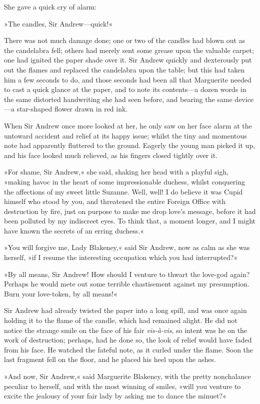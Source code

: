 She gave a quick cry of alarm:

»The candles, Sir Andrew\allowbreak---\allowbreak quick!«

There was not much damage done; one or two of the candles had blown out as the candelabra fell; others had merely sent some grease upon the valuable carpet; one had ignited the paper shade over it. Sir Andrew quickly and dexterously put out the flames and replaced the candelabra upon the table; but this had taken him a few seconds to do, and those seconds had been all that Marguerite needed to cast a quick glance at the paper, and to note its contents\allowbreak---\allowbreak a dozen words in the same distorted handwriting she had seen before, and bearing the same device\allowbreak---\allowbreak a star-shaped flower drawn in red ink.

When Sir Andrew once more looked at her, he only saw on her face alarm at the untoward accident and relief at its happy issue; whilst the tiny and momentous note had apparently fluttered to the ground. Eagerly the young man picked it up, and his face looked much relieved, as his fingers closed tightly over it.

»For shame, Sir Andrew,« she said, shaking her head with a playful sigh, »making havoc in the heart of some impressionable duchess, whilst conquering the affections of my sweet little Suzanne. Well, well! I do believe it was Cupid himself who stood by you, and threatened the entire Foreign Office with destruction by fire, just on purpose to make me drop love's message, before it had been polluted by my indiscreet eyes. To think that, a moment longer, and I might have known the secrets of an erring duchess.«

»You will forgive me, Lady Blakeney,« said Sir Andrew, now as calm as she was herself, »if I resume the interesting occupation which you had interrupted?«

»By all means, Sir Andrew! How should I venture to thwart the love-god again? Perhaps he would mete out some terrible chastisement against my presumption. Burn your love-token, by all means!«

Sir Andrew had already twisted the paper into a long spill, and was once again holding it to the flame of the candle, which had remained alight. He did not notice the strange smile on the face of his fair \textit{vis-à-vis}, so intent was he on the work of destruction; perhaps, had he done so, the look of relief would have faded from his face. He watched the fateful note, as it curled under the flame. Soon the last fragment fell on the floor, and he placed his heel upon the ashes.

»And now, Sir Andrew,« said Marguerite Blakeney, with the pretty nonchalance peculiar to herself, and with the most winning of smiles, »will you venture to excite the jealousy of your fair lady by asking me to dance the minuet?«